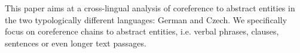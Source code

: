 This paper aims at a cross-lingual analysis of coreference to abstract entities in the two typologically different languages: German and Czech. We specifically focus on coreference chains to abstract entities, i.e. verbal phrases, clauses, sentences or even longer text passages.
